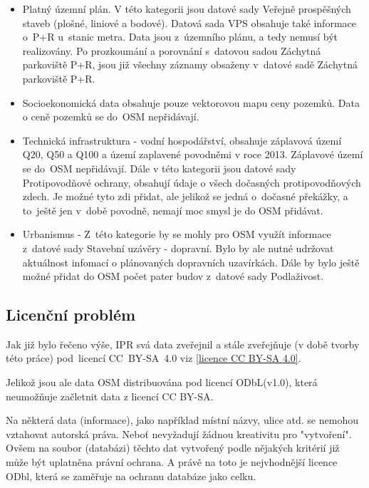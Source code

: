 \begin{itemize}
    \item   Platný územní plán. V této kategorii jsou datové sady
            Veřejně prospěšných staveb (plošné, liniové a bodové).
            Datová sada VPS obsahuje také informace o~P+R u~stanic
            metra. Data jsou z~územního plánu, a tedy nemusí být
            realizovány. Po prozkoumání a porovnání s~datovou sadou
            Záchytná parkoviště P+R, jsou již všechny záznamy obsaženy
            v~datové sadě Záchytná parkoviště P+R.

    \item   Socioekonomická data obsahuje pouze vektorovou mapu ceny
            pozemků. Data o ceně pozemků se do~OSM nepřidávají. 

    \item   Technická infrastruktura - vodní hospodářství, obsahuje
            záplavová území Q20, Q50 a Q100 a území zaplavené
            povodněmi v roce 2013. Záplavové území se do~OSM
            nepřidávají. Dále v této kategorii jsou datové sady
            Protipovodňové ochrany, obsahují údaje o všech dočasných
            protipovodňových zdech. Je možné tyto zdi přidat, ale
            jelikož se jedná o~dočasné překážky, a to~ještě jen v~době
            povodně, nemají moc smysl je do OSM přidávat.

    \item   Urbanismus - Z~této kategorie by se mohly pro OSM využít
            informace z~datové sady
            Stavební uzávěry - dopravní. Bylo by ale nutné udržovat
            aktuálnost infomací o plánovaných dopravních uzavírkách.
            Dále by bylo ještě možné přidat do OSM počet pater budov
            z~datové sady Podlaživost.
\end{itemize}


\subsection{Licenční problém}
\label{Licenční problém}
Jak již bylo řečeno výše, IPR svá data zveřejnil a stále zveřejňuje
(v době tvorby této práce) pod~licencí CC~BY-SA~4.0 viz \ref{licence CC BY-SA 4.0}.

Jelikož jsou ale data OSM distribuována pod licencí ODbL(v1.0), která
neumožňuje začletnit data z licencí CC BY-SA.

Na některá data (informace), jako například místní názvy, ulice atd.
se nemohou vztahovat autorská práva. Neboť nevyžadují žádnou 
kreativitu pro "vytvoření". Ovšem na soubor (databázi) těchto dat
vytvořený podle nějakých kritérií již může být uplatněna právní
ochrana. A právě na toto je nejvhodnější licence ODbl, která se
zaměřuje na ochranu databáze jako celku.

